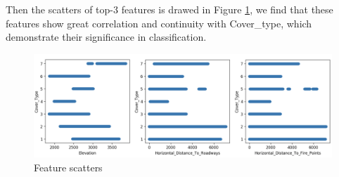 \documentclass[11pt,en]{elegantpaper}
\begin{document}
Then the scatters of top-3 features is drawed in Figure  \ref{feature scatters}, we find that these features show great correlation and continuity with Cover\_type, which demonstrate their significance in classification.
\begin{figure}[H]
	\centering
	\includegraphics[width=1\textwidth]{image/scatter.png}
	\caption{Feature scatters}
	\label{feature scatters}
\end{figure}
\end{document}
